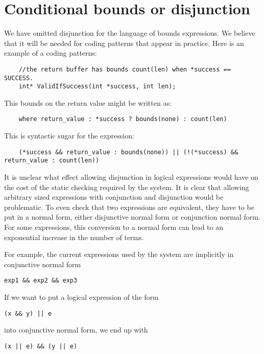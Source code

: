 \section{Conditional bounds or disjunction}

We have omitted disjunction for the language of bounds expressions. We
believe that it will be needed for coding patterns that appear in
practice. Here is an example of a coding patterns:

\begin{verbatim}
    //the return buffer has bounds count(len) when *success == SUCCESS.
    int* ValidIfSuccess(int *success, int len); 
\end{verbatim}

This bounds on the return value might be written as:
\begin{verbatim}
    where return_value : *success ? bounds(none) : count(len)
\end{verbatim}

This is syntactic sugar for the expression:

\begin{verbatim}
    (*success && return_value : bounds(none)) || (!(*success) && return_value : count(len))
\end{verbatim}

It is unclear what effect allowing disjunction in logical expressions
would have on the cost of the static checking required by the system. It
is clear that allowing arbitrary sized expressions with conjunction and
disjunction would be problematic. To even check that two expressions are
equivalent, they have to be put in a normal form, either disjunctive
normal form or conjunction normal form. For some expressions, this
conversion to a normal form can lead to an exponential increase in the
number of terms.

For example, the current expressions used by the system are implicitly
in conjunctive normal form

\begin{verbatim}
exp1 && exp2 && exp3
\end{verbatim}

If we want to put a logical expression of the form
\begin{verbatim}
(x && y) || e
\end{verbatim}

into conjunctive normal form, we end up with

\begin{verbatim}
(x || e) && (y || e)
\end{verbatim}

